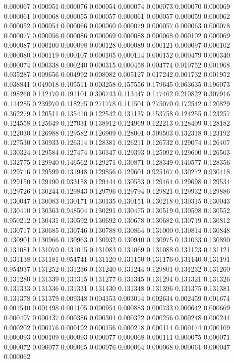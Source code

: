 0.000067
0.000051
0.000076
0.000054
0.000074
0.000073
0.000070
0.000069
0.000061
0.000068
0.000055
0.000057
0.000061
0.000057
0.000059
0.000062
0.000052
0.000054
0.000066
0.000060
0.000079
0.000057
0.000063
0.000078
0.000077
0.000056
0.000086
0.000069
0.000088
0.000068
0.000102
0.000069
0.000087
0.000100
0.000098
0.000128
0.000089
0.000121
0.000097
0.000102
0.000080
0.000119
0.000107
0.000105
0.000114
0.000152
0.000479
0.000340
0.000074
0.000338
0.000240
0.000315
0.000458
0.004774
0.010752
0.001968
0.035287
0.009656
0.004992
0.008082
0.005127
0.017242
0.001732
0.001952
0.038841
0.049018
0.105511
0.003258
0.157556
0.179645
0.063635
0.196073
0.198260
0.112470
0.191101
0.306743
0.113447
0.147462
0.210822
0.307916
0.144285
0.239970
0.118275
0.271778
0.111501
0.275070
0.172542
0.120829
0.362279
0.120511
0.135410
0.122542
0.131137
0.153758
0.124255
0.123257
0.124558
0.125649
0.127031
0.138912
0.124969
0.122213
0.128409
0.128182
0.122030
0.126988
0.129582
0.126909
0.128001
0.509503
0.132318
0.123192
0.127530
0.130933
0.126314
0.128381
0.126211
0.126732
0.129074
0.126407
0.130324
0.129584
0.127474
0.130347
0.129393
0.125092
0.129600
0.126503
0.132775
0.129940
0.146562
0.129271
0.130871
0.128349
0.140577
0.128356
0.129716
0.129599
0.131948
0.129856
0.129601
0.925167
0.130272
0.930418
0.129150
0.129190
0.933158
0.129444
0.130553
0.129464
0.129698
0.129534
0.129726
0.130244
0.129843
0.129796
0.129794
0.129821
0.129932
0.129886
0.130047
0.130083
0.130171
0.130135
0.130151
0.130218
0.130315
0.130043
0.130410
0.130363
0.948504
0.130291
0.130475
0.130519
0.130598
0.130552
0.950212
0.130431
0.130592
0.130692
0.130678
0.130682
0.130719
0.130812
0.130717
0.130685
0.130746
0.130788
0.130864
0.131000
0.130814
0.130848
0.130901
0.130966
0.130963
0.130932
0.130940
0.130975
0.131033
0.130890
0.131081
0.131070
0.131015
0.131083
0.131069
0.131088
0.131123
0.131121
0.131138
0.131181
0.954741
0.131120
0.131150
0.131176
0.131140
0.131191
0.954937
0.131252
0.131236
0.131240
0.131244
0.129801
0.131232
0.131260
0.131280
0.131339
0.131315
0.131277
0.131345
0.131294
0.131321
0.131326
0.131333
0.131336
0.131331
0.131430
0.131348
0.131396
0.131375
0.131381
0.131378
0.131379
0.009348
0.004153
0.003014
0.002634
0.002459
0.001674
0.001540
0.001498
0.001105
0.000954
0.000883
0.000733
0.000642
0.000669
0.000497
0.000437
0.000386
0.000304
0.000322
0.000256
0.000248
0.000244
0.000202
0.000176
0.000192
0.000156
0.000218
0.000114
0.000174
0.000109
0.000093
0.000109
0.000093
0.000077
0.000068
0.000111
0.000075
0.000071
0.000072
0.000077
0.000065
0.000076
0.000064
0.000068
0.000061
0.000047
0.000062
